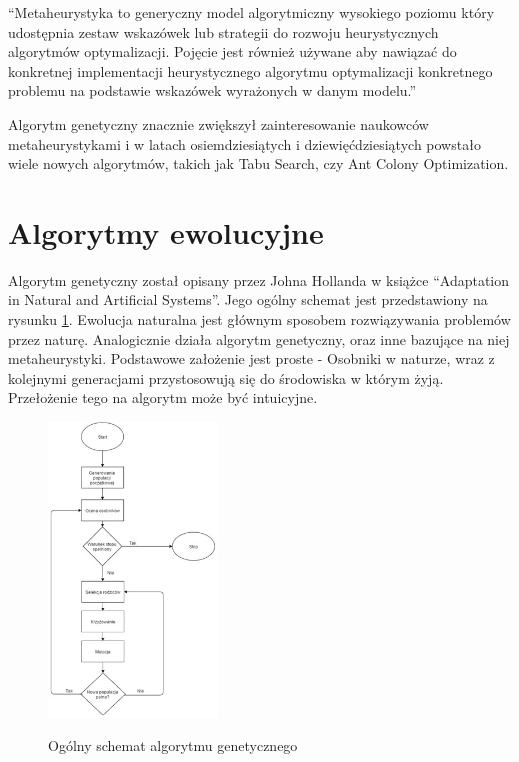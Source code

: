 \documentclass[twoside]{iisthesis}
\begin{document}
``Metaheurystyka to generyczny model algorytmiczny wysokiego poziomu który udostępnia zestaw wskazówek lub strategii do rozwoju heurystycznych algorytmów optymalizacji. Pojęcie jest również używane aby nawiązać do konkretnej implementacji heurystycznego algorytmu optymalizacji konkretnego problemu na podstawie wskazówek wyrażonych w danym modelu.''

Algorytm genetyczny znacznie zwiększył zainteresowanie naukowców metaheurystykami i w latach osiemdziesiątych i dziewięćdziesiątych powstało wiele nowych algorytmów, takich jak Tabu Search, czy Ant Colony Optimization.

\section{Algorytmy ewolucyjne}

Algorytm genetyczny został opisany przez Johna Hollanda w książce ``Adaptation in Natural and Artificial Systems''. Jego ogólny schemat jest przedstawiony na rysunku \ref{fig:schematGA}. Ewolucja naturalna jest głównym sposobem rozwiązywania problemów przez naturę. Analogicznie działa algorytm genetyczny, oraz inne bazujące na niej metaheurystyki. Podstawowe założenie jest proste - Osobniki w naturze, wraz z kolejnymi generacjami przystosowują się do środowiska w którym żyją. Przełożenie tego na algorytm może być intuicyjne.

\begin{figure}
\caption{Ogólny schemat algorytmu genetycznego}
\includegraphics[width=0.4\textwidth]{schematGA.jpg}
\label{fig:schematGA}
\end{figure}
\end{document}

